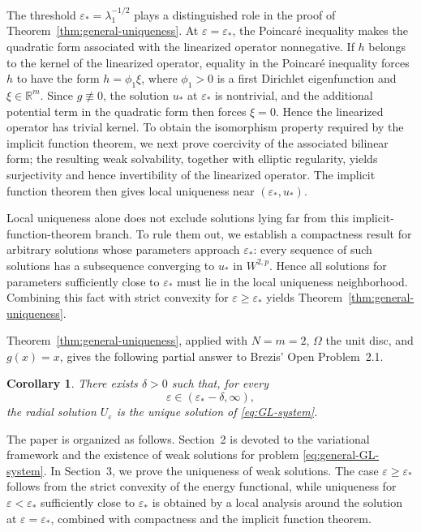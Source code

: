 \documentclass[11pt]{amsart}
\theoremstyle{definition}
\theoremstyle{plain}
\newtheorem{corollary}[theorem]{Corollary}
\numberwithin{equation}{section}
\begin{document}
The threshold $\varepsilon_*=\lambda_1^{-1/2}$ plays a distinguished role in the proof of Theorem~\ref{thm:general-uniqueness}. At $\varepsilon=\varepsilon_*$, the Poincar\'e inequality makes the quadratic form associated with the linearized operator nonnegative. If $h$ belongs to the kernel of the linearized operator, equality in the Poincar\'e inequality forces $h$ to have the form $h=\phi_1\xi$, where $\phi_1>0$ is a first Dirichlet eigenfunction and $\xi\in\mathbb R^m$. Since $g\not\equiv0$, the solution $u_*$ at $\varepsilon_*$ is nontrivial, and the additional potential term in the quadratic form then forces $\xi=0$. Hence the linearized operator has trivial kernel. To obtain the isomorphism property required by the implicit function theorem, we next prove coercivity of the associated bilinear form; the resulting weak solvability, together with elliptic regularity, yields surjectivity and hence invertibility of the linearized operator. The implicit function theorem then gives local uniqueness near $(\varepsilon_*,u_*)$.




Local uniqueness alone does not exclude solutions lying far from this implicit-function-theorem branch. To rule them out, we establish a compactness result for arbitrary solutions whose parameters approach $\varepsilon_*$: every sequence of such solutions has a subsequence converging to $u_*$ in $W^{2,p}$. Hence all solutions for parameters sufficiently close to $\varepsilon_*$ must lie in the local uniqueness neighborhood. Combining this fact with strict convexity for $\varepsilon\geq\varepsilon_*$ yields Theorem~\ref{thm:general-uniqueness}.



Theorem~\ref{thm:general-uniqueness}, applied with $N=m=2$,
$\Omega$ the unit disc, and $g(x)=x$, gives the following partial
answer to Brezis' Open Problem~2.1.

\begin{corollary}\label{thm:local-uniqueness}
	There exists $\delta>0$ such that, for every
	\[
	\varepsilon\in
	\left(
	\varepsilon_*-\delta,
	\infty
	\right),
	\]
	the radial solution $U_\varepsilon$ is the unique solution of
	\eqref{eq:GL-system}.
\end{corollary}


The paper is organized as follows. Section~2 is devoted to the variational
framework and the existence of weak solutions for problem \eqref{eq:general-GL-system}. In Section~3, we prove the uniqueness of weak
solutions. The case $\varepsilon\geq\varepsilon_*$ follows from the
strict convexity of the energy functional, while uniqueness for $\varepsilon<\varepsilon_*$ sufficiently close to $\varepsilon_*$ is obtained by a local analysis around
the solution at $\varepsilon=\varepsilon_*$, combined with compactness and
the implicit function theorem.
\end{document}
